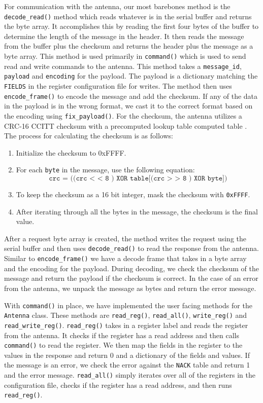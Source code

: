 For communication with the antenna, our most barebones method is the \texttt{decode\_read()} method which reads whatever is in the serial buffer and returns the byte array.
It accomplishes this by reading the first four bytes of the buffer to determine the length of the message in the header. 
It then reads the message from the buffer plus the checksum and returns the header plus the message as a byte array.
This method is used primarily in \texttt{command()} which is used to send read and write commands to the antenna.
This method takes a \texttt{message\_id}, \texttt{payload} and \texttt{encoding} for the payload.
The payload is a dictionary matching the \texttt{FIELDS} in the register configuration file for writes. 
The method then uses \texttt{encode\_frame()} to encode the message and add the checksum.
If any of the data in the payload is in the wrong format, we cast it to the correct format based on the encoding using \texttt{fix\_payload()}.
For the checksum, the antenna utilizes a CRC-16 CCITT checksum with a precomputed lookup table computed table \cite{koopman2004cyclic}.
The process for calculating the checksum is as follows:
\begin{enumerate}
    \item Initialize the checksum to 0xFFFF.
    \item For each \texttt{byte} in the message, use the following equation:
    \begin{equation}
        \texttt{crc = ((crc < < 8 ) XOR table[(crc > > 8 ) XOR byte])}
    \end{equation}
    \item To keep the checksum as a 16 bit integer, mask the checksum with \texttt{0xFFFF}.
    \item After iterating through all the bytes in the message, the checksum is the final value.
\end{enumerate}
After a request byte array is created, the method writes the request using the serial buffer and then uses \texttt{decode\_read()} to read the response from the antenna.
Similar to \texttt{encode\_frame()} we have a decode frame that takes in a byte array and the encoding for the payload.
During decoding, we check the checksum of the message and return the payload if the checksum is correct.
In the case of an error from the antenna, we unpack the message as bytes and return the error message.

With \texttt{command()} in place, we have implemented the user facing methods for the \texttt{Antenna} class.
These methods are \texttt{read\_reg()}, \texttt{read\_all()}, \texttt{write\_reg()} and \texttt{read\_write\_reg()}.
\texttt{read\_reg()} takes in a register label and reads the register from the antenna.
It checks if the register has a read address and then calls \texttt{command()} to read the register.
We then map the fields in the register to the values in the response and return 0 and a dictionary of the fields and values.
If the message is an error, we check the error against the \texttt{NACK} table and return 1 and the error message.
\texttt{read\_all()} simply iterates over all of the registers in the configuration file, checks if the register has a read address, and then runs \texttt{read\_reg()}.

